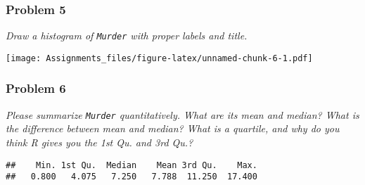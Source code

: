 \documentclass[
]{article}
\newenvironment{Shaded}{\begin{snugshade}}{\end{snugshade}}
\newcommand{\AttributeTok}[1]{\textcolor[rgb]{0.77,0.63,0.00}{#1}}
\newcommand{\FunctionTok}[1]{\textcolor[rgb]{0.00,0.00,0.00}{#1}}
\newcommand{\NormalTok}[1]{#1}
\newcommand{\SpecialCharTok}[1]{\textcolor[rgb]{0.00,0.00,0.00}{#1}}
\newcommand{\StringTok}[1]{\textcolor[rgb]{0.31,0.60,0.02}{#1}}
\begin{document}
\hypertarget{problem-5}{%
\subsubsection{Problem 5}\label{problem-5}}

\emph{Draw a histogram of \texttt{Murder} with proper labels and title.}

\begin{Shaded}
\end{Shaded}

\texttt{[image: Assignments\_files/figure-latex/unnamed-chunk-6-1.pdf]}

\hypertarget{problem-6}{%
\subsubsection{Problem 6}\label{problem-6}}

\emph{Please summarize \texttt{Murder} quantitatively. What are its mean
and median? What is the difference between mean and median? What is a
quartile, and why do you think R gives you the 1st Qu. and 3rd Qu.?}

\begin{Shaded}
\end{Shaded}

\begin{verbatim}
##    Min. 1st Qu.  Median    Mean 3rd Qu.    Max. 
##   0.800   4.075   7.250   7.788  11.250  17.400
\end{verbatim}
\end{document}

